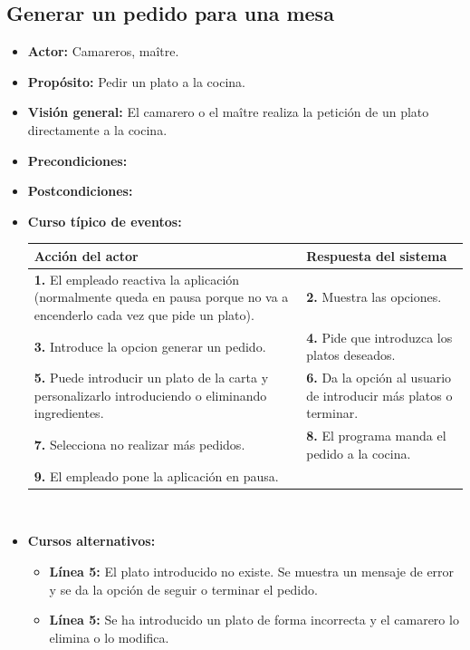 \documentclass[spanish,a4paper,11pt, twoside]{report}	%
\begin{document}

		\subsection{Generar un pedido para una mesa}
			\begin{itemize}
			\item \textbf{Actor:} Camareros, maître.
			\item \textbf{Propósito: } Pedir un plato a la cocina.
			\item \textbf{Visión general:} El camarero o el maître realiza la petición de un plato directamente a la cocina.
			\item \textbf{Precondiciones:} 
			\item \textbf{Postcondiciones:} 
			\item \textbf{Curso típico de eventos:} 	\\
				\begin{tabular}{|p{6cm}||p{6cm}|}
				\hline
				\textbf{Acción del actor} & \textbf{Respuesta del sistema} \\ \hline \hline
				\textbf{1.} El empleado reactiva la aplicación (normalmente queda en pausa porque no va a encenderlo cada vez que pide un plato). & \textbf{2.} Muestra las opciones.\\ \hline 
				\textbf{3.} Introduce la opcion generar un pedido. & \textbf{4.} Pide que introduzca los platos deseados. \\ \hline
				\textbf{5.} Puede introducir un plato de la carta y personalizarlo introduciendo o eliminando ingredientes. & \textbf{6.} Da la opción al usuario de introducir más platos o terminar. \\ \hline
				\textbf{7.} Selecciona no realizar más pedidos.	& \textbf{8.} El programa manda el pedido a la cocina. \\ \hline
				\textbf{9.} El empleado pone la aplicación en pausa. & \\ \hline
			\end{tabular}
			\\
			\item \textbf{Cursos alternativos:} 
			\begin{itemize}
			\item  \textbf{Línea 5:} El plato introducido no existe. Se muestra un mensaje de error y se da la opción de seguir o terminar el pedido.
			\item  \textbf{Línea 5:} Se ha introducido un plato de forma incorrecta y el camarero lo elimina o lo modifica.
			\end {itemize}
		\end {itemize}
		
\end{document}
